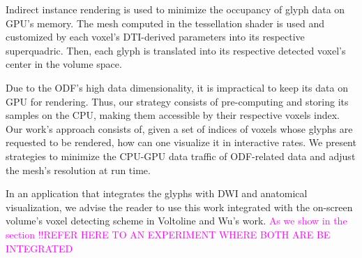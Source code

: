 \documentclass[twoside,twocolumn,10pt]{article}
\begin{document}
Indirect instance rendering is used to minimize the occupancy of glyph data on GPU's memory. The mesh computed in the tessellation shader is used and customized by each voxel's DTI-derived parameters into its respective superquadric. Then, each glyph is translated into its respective detected voxel's center in the volume space.











Due to the ODF's high data dimensionality, it is impractical to keep its data on GPU for rendering. Thus, our strategy consists of pre-computing and storing its samples on the CPU, making them accessible by their respective voxels index. Our work's approach consists of, given a set of indices of voxels whose glyphs are requested to be rendered, how can one visualize it in interactive rates. We present strategies to minimize the CPU-GPU data traffic of ODF-related data and adjust the mesh's resolution at run time.%


In an application that integrates the glyphs with DWI and anatomical visualization, we advise the reader to use this work integrated with the on-screen volume's voxel detecting scheme in Voltoline and Wu's \cite{voltoline2021} work. \textcolor{magenta}{As we show in the section !!REFER HERE TO AN EXPERIMENT WHERE BOTH ARE BE INTEGRATED}



\end{document}
